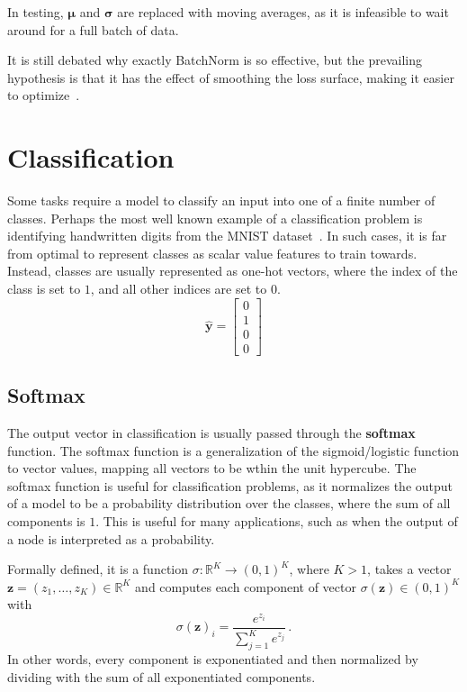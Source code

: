 \documentclass[12pt]{report}
\theoremstyle{definition}
\theoremstyle{remark}
\begin{document}
In testing, $\boldsymbol{\mu}$ and $\boldsymbol{\sigma}$ are replaced with moving averages, as it is infeasible to wait around for a full batch of data.

It is still debated why exactly BatchNorm is so effective, but the prevailing hypothesis is that it has the effect of smoothing the loss surface, making it easier to optimize~\cite{ioffe_batch_2015, ioffe_batch_2017, santurkar_how_2019}.

\section{Classification}\label{sec:classification}
Some tasks require a model to classify an input into one of a finite number of classes. Perhaps the most well known example of a classification problem is identifying handwritten digits from the MNIST dataset~\cite{lecun_gradient-based_1998}. In such cases, it is far from optimal to represent classes as scalar value features to train towards. Instead, classes are usually represented as one-hot vectors, where the index of the class is set to $1$, and all other indices are set to $0$.
\begin{equation}
    \mathbf{\hat{y}} = \begin{bmatrix}
        0 \\
        1 \\
        0 \\
        0
    \end{bmatrix}
\end{equation}
\subsection{Softmax}
The output vector in classification is usually passed through the \textbf{softmax} function. The softmax function is a generalization of the sigmoid/logistic function to vector values, mapping all vectors to be wthin the unit hypercube. The softmax function is useful for classification problems, as it normalizes the output of a model to be a probability distribution over the classes, where the sum of all components is $1$. This is useful for many applications, such as when the output of a node is interpreted as a probability.

Formally defined, it is a function $\sigma\colon \mathbb{R}^K \to (0, 1)^K$, where $K > 1$, takes a vector $\mathbf{z} = (z_1, \dotsc, z_K) \in \mathbb{R}^K$ and computes each component of vector $\sigma(\mathbf{z}) \in (0, 1)^K$ with
\begin{equation}
\sigma(\mathbf{z})_i = \frac{e^{z_i}}{\sum_{j=1}^K e^{z_j}}\,.
\end{equation}
In other words, every component is exponentiated and then normalized by dividing with the sum of all exponentiated components.
\end{document}
